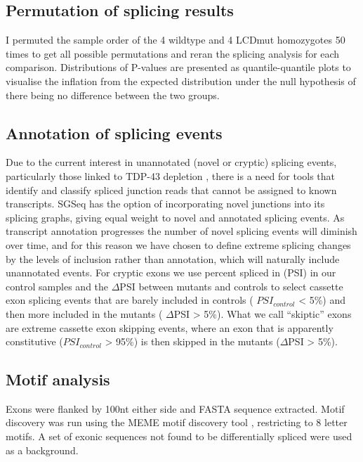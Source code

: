 \subsection{Permutation of splicing results}
I permuted the sample order of the 4 wildtype and 4 LCDmut homozygotes 50 times to get all possible permutations and reran the splicing analysis for each comparison. Distributions of P-values are presented as quantile-quantile plots to visualise the inflation from the expected distribution under the null hypothesis of there being no difference between the two groups. 

\subsection{Annotation of splicing events}
Due to the current interest in unannotated (novel or cryptic) splicing events, particularly those linked 
to TDP-43 depletion \citep{Humphrey2017, Ling2015}, there is a need for tools that identify and classify spliced junction reads that cannot be assigned to known transcripts. SGSeq has the option of incorporating  novel  junctions  into  its  splicing  graphs,  giving  equal  weight  to  novel  and  annotated splicing events. 
As transcript annotation progresses the number of novel splicing events will diminish over time, and for this reason we have chosen to define extreme splicing changes by the levels of inclusion rather 
than annotation, which will naturally include unannotated events. For cryptic exons we use percent 
spliced  in  (PSI)  in  our  control  samples  and  the   $\Delta$PSI  between  mutants  and  controls  to  select cassette exon splicing events that are barely included in controls ( $PSI_{control}$ < 5\%) and then more included in the mutants ( $\Delta$PSI > 5\%). What we call ``skiptic'' exons are extreme cassette exon skipping events, where an exon that is apparently constitutive ($PSI_{control}$ > 95\%) is then skipped in the mutants ($\Delta$PSI > 5\%).

\subsection{Motif analysis}
Exons were flanked by 100nt either side and FASTA sequence extracted. Motif discovery was run using the  MEME  motif  discovery  tool  \citep{Bailey2009-lw},  restricting  to  8  letter  motifs.  A  set  of  exonic sequences not found to be differentially spliced were used as a background. 

